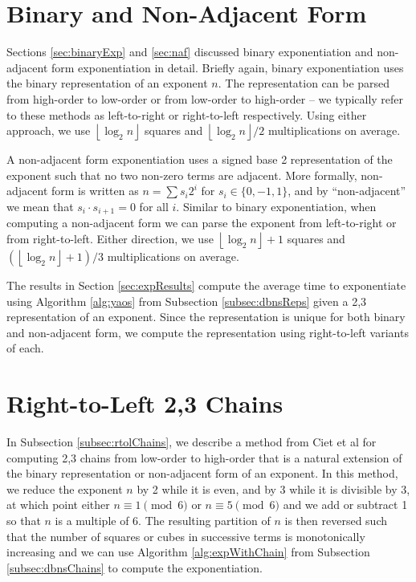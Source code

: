 \documentclass{ucalgthes1}
\theoremstyle{definition}
\newcommand{\floor}[1]{\left\lfloor #1 \right\rfloor}
\begin{document}
\section{Binary and Non-Adjacent Form}

Sections \ref{sec:binaryExp} and \ref{sec:naf} discussed binary exponentiation and non-adjacent form exponentiation in detail.  Briefly again, binary exponentiation uses the binary representation of an exponent $n$.  The representation can be parsed from high-order to low-order or from low-order to high-order -- we typically refer to these methods as left-to-right or right-to-left respectively.  Using either approach, we use $\floor{\log_2n}$ squares and $\floor{\log_2n}/2$ multiplications on average.

A non-adjacent form exponentiation uses a signed base 2 representation of the exponent such that no two non-zero terms are adjacent.  More formally, non-adjacent form is written as $n=\sum s_i2^i$ for $s_i \in \{0, -1, 1\}$, and by ``non-adjacent'' we mean that $s_i \cdot s_{i+1} = 0$ for all $i$.  Similar to binary exponentiation, when computing a non-adjacent form we can parse the exponent from left-to-right or from right-to-left.  Either direction, we use $\floor{\log_2n} + 1$ squares and $(\floor{\log_2n}+1)/3$ multiplications on average.

The results in Section \ref{sec:expResults} compute the average time to exponentiate using Algorithm \ref{alg:yaos} from Subsection \ref{subsec:dbnsReps} given a 2,3 representation of an exponent.  Since the representation is unique for both binary and non-adjacent form, we compute the representation using right-to-left variants of each.


\section{Right-to-Left 2,3 Chains}
\label{sec:expR2LChains}

In Subsection \ref{subsec:rtolChains}, we describe a method from Ciet et al \cite[Figure 8]{Ciet2006} for computing 2,3 chains from low-order to high-order that is a natural extension of the binary representation or non-adjacent form of an exponent.  In this method, we reduce the exponent $n$ by 2 while it is even, and by 3 while it is divisible by 3, at which point either $n \equiv 1 \pmod 6$ or $n \equiv 5 \pmod 6$ and we add or subtract 1 so that $n$ is a multiple of 6.  The resulting partition of $n$ is then reversed such that the number of squares or cubes in successive terms is monotonically increasing and we can use Algorithm \ref{alg:expWithChain} from Subsection \ref{subsec:dbnsChains} to compute the exponentiation.
\end{document}
